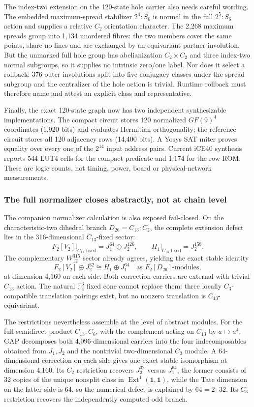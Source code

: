 \documentclass[11pt,letterpaper]{article}
\newcommand{\tagbox}[3]{\tikz[baseline=(X.base)]{\node[inner xsep=3.5pt,inner ysep=1.4pt,rounded corners=1.6pt,fill=#1,text=#2,font=\bfseries\sffamily\tiny] (X) {#3};}}
\newcommand{\PROVED}{\tagbox{greenlite}{green!45!black}{PROVED}}
\begin{document}
The index-two extension on the 120-state hole carrier also needs careful
wording. The embedded maximum-spread stabilizer $2^4{:}S_6$ is normal in the
full $2^5{:}S_6$ action and supplies a relative $C_2$ orientation character.
The 2,268 maximum spreads group into 1,134 unordered fibres: the two members
cover the same points, share no lines and are exchanged by an equivariant
partner involution. But the unmarked full hole group has abelianization
$C_2\times C_2$ and three index-two normal subgroups, so it supplies no
intrinsic zero/one label. Nor does it select a rollback: 376 outer involutions
split into five conjugacy classes under the spread subgroup and the centralizer
of the hole action is trivial. Runtime rollback must therefore name and attest
an explicit class and representative. \PROVED

Finally, the exact 120-state graph now has two independent synthesizable
implementations. The compact circuit stores 120 normalized $GF(9)^4$
coordinates (1,920 bits) and evaluates Hermitian orthogonality; the reference
circuit stores all 120 adjacency rows (14,400 bits). A Yosys SAT miter proves
equality over every one of the $2^{14}$ input address pairs. Current iCE40
synthesis reports 544 LUT4 cells for the compact predicate and 1,174 for the
row ROM. These are logic counts, not timing, power, board or physical-network
measurements. \PROVED

\subsubsection{The full normalizer closes abstractly, not at chain level}

The companion normalizer calculation is also exposed fail-closed. On the
characteristic-two dihedral branch
$D_{26}=C_{13}{:}C_2$, the complete extension defect lies in the
316-dimensional $C_{13}$-fixed sector:
\[
 F_2[V_2]\big|_{C_{13}\text{-fixed}}=J_1^{64}\oplus J_2^{126},
 \qquad H_1\big|_{C_{13}\text{-fixed}}=J_2^{158}.
\]
The complementary $W_{12}^{315}$ sector already agrees, yielding the exact
stable identity
\[
 F_2[V_2]\oplus J_2^{32}\cong H_1\oplus J_1^{64}
 \quad\text{as }F_2[D_{26}]\text{-modules},
\]
at dimension 4,160 on each side. Both correction carriers are external with
trivial $C_{13}$ action. The natural $\mathbb F_4^3$ fixed cone cannot replace
them: three locally $C_3$-compatible translation pairings exist, but no
nonzero translation is $C_{13}$-equivariant. \PROVED

The restrictions nevertheless assemble at the level of abstract modules.
For the full semidirect product $C_{13}{:}C_6$, with the complement acting on
$C_{13}$ by $a\mapsto a^4$, GAP decomposes both 4,096-dimensional carriers
into the four indecomposables obtained from $J_1,J_2$ and the nontrivial
two-dimensional $C_3$ module. A 64-dimensional correction on each side gives
one exact stable isomorphism at dimension 4,160. Its $C_2$ restriction recovers
$J_2^{32}$ versus $J_1^{64}$; the former consists of 32 copies of the unique
nonsplit class in $\operatorname{Ext}^1(\mathbf1,\mathbf1)$, while the Tate
dimension on the latter side is 64, so the numerical defect is explained by
$64=2\cdot32$. Its $C_3$ restriction recovers the independently computed odd
branch. \PROVED
\end{document}
